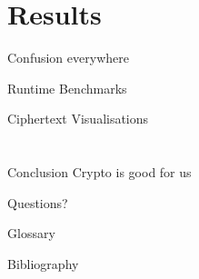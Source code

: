 \documentclass[aspectratio=169]{beamer}
\begin{document}
  \section{Results}
  \begin{frame}{Confusion everywhere}\end{frame}
  \begin{frame}{Runtime Benchmarks}\end{frame}
  \begin{frame}{Ciphertext Visualisations}\end{frame}

  \section*{}
  \begin{frame}{Conclusion}
    Crypto is good for us
  \end{frame}

  \begin{frame}[c]
    \centering
    \Large Questions?
  \end{frame}

  \begin{frame}[allowframebreaks]{Glossary}
    \printnoidxglossary[type=acronym]
  \end{frame}

  \begin{frame}[allowframebreaks]{Bibliography}
    \printbibliography
  \end{frame}
\end{document}
